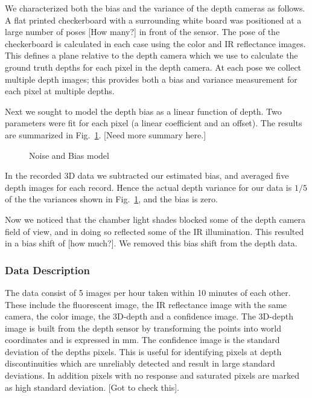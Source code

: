 We characterized both the bias and the variance of the depth cameras as follows.  A flat printed checkerboard with a surrounding white board was positioned at a large number of poses [How many?] in front of the sensor.  The pose of the checkerboard is calculated in each case using the color and IR reflectance images.  This defines a plane relative to the depth camera which we use to calculate the ground truth depths for each pixel in the depth camera.  At each pose we collect multiple depth images; this provides both a bias and variance measurement for each pixel at multiple depths.

Next we sought to model the depth bias as a linear function of depth.  Two parameters were fit for each pixel (a linear coefficient and an offset).  The results are summarized in Fig.~\ref{fig:Bias}.  [Need more summary here.]

\begin{figure}
\caption{Noise and Bias model}
\label{fig:Bias}
\end{figure}


In the recorded 3D data we subtracted our estimated bias, and averaged five depth images for each record.  Hence the actual depth variance for our data is $1/5$ of the the variances shown in Fig.~\ref{fig:Bias}, and the bias is zero.

Now we noticed that the chamber light shades blocked some of the depth camera field of view, and in doing so reflected some of the IR illumination.  This resulted in a bias shift of [how much?].  We removed this bias shift from the depth data.

\subsubsection{Data Description}

The data consist of 5 images per hour taken within 10 minutes of each other.  These include the fluorescent image, the IR reflectance image with the same camera, the color image, the 3D-depth and a confidence image.  The 3D-depth image is built from the depth sensor by transforming the points into world coordinates and is expressed in mm.  The confidence image is the standard deviation of the depths pixels.  This is useful for identifying pixels at depth discontinuities which are unreliably detected and result in large standard deviations.  In addition pixels with no response and saturated pixels are marked as high standard deviation. [Got to check this].



